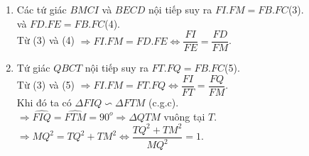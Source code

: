 \begin{bt}
{\begin{enumerate}
			$\Rightarrow \widehat{BIM}=\widehat{BCM}\Rightarrow$ tứ giác $BMCI$ nội tiếp.\\
			$\Rightarrow B,C,I,M$ cùng thuộc một đường tròn\qquad (2).\\
			Từ (1) và (2) $\Rightarrow B,M,O,I,C$ cùng thuộc đường tròn đường kính $OM$.
			\item Các tứ giác $BMCI$ và $BECD$ nội tiếp suy ra  $ FI.FM=FB.FC$\qquad (3).\\
			và  $FD.FE=FB.FC$\qquad (4).\\
			Từ (3) và (4) $\Rightarrow FI.FM=FD.FE\Leftrightarrow \dfrac{FI}{FE}=\dfrac{FD}{FM}$.
			\item Tứ giác $QBCT$ nội tiếp suy ra $ FT.FQ=FB.FC$\qquad (5).\\
			Từ (3) và (5) $\Rightarrow FI.FM=FT.FQ\Leftrightarrow\dfrac{FI}{FT}=\dfrac{FQ}{FM}$.\\
			Khi đó ta có $\Delta FIQ\backsim\Delta FTM$ (c.g.c).\\
			$\Rightarrow \widehat{FIQ}=\widehat{FTM}=90^o\Rightarrow \Delta QTM$ vuông tại $T$.\\
			$\Rightarrow MQ^2=TQ^2+TM^2\Leftrightarrow\dfrac{TQ^2+TM^2}{MQ^2}=1$. 
		\end{enumerate}
	}
\end{bt}

